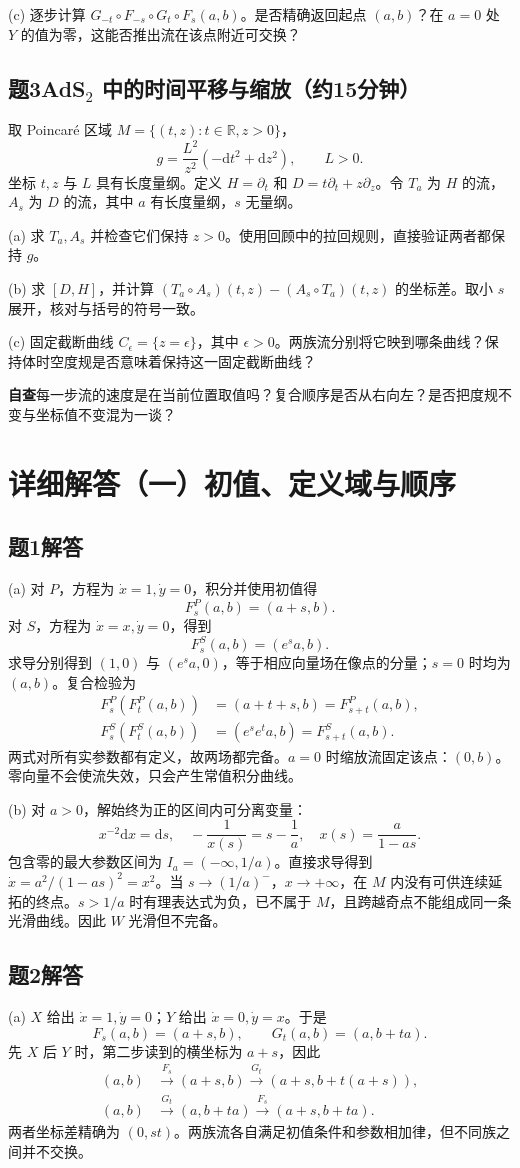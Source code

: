 \documentclass[11pt,a4paper]{article}
\newcommand{\D}{\mathrm d}
\newcommand{\head}[1]{\section*{\color{teal}#1}}
\begin{document}
(c) 逐步计算 $G_{-t}\circ F_{-s}\circ G_t\circ F_s(a,b)$。是否精确返回起点 $(a,b)$？在 $a=0$ 处 $Y$ 的值为零，这能否推出流在该点附近可交换？

\subsection*{题3\quad AdS$_2$ 中的时间平移与缩放（约15分钟）}
取 Poincar\'e 区域 $M=\{(t,z):t\in\mathbb R,z>0\}$，
\[
 g=\frac{L^2}{z^2}(-\D t^2+\D z^2),\qquad L>0.
\]
坐标 $t,z$ 与 $L$ 具有长度量纲。定义 $H=\partial_t$ 和 $D=t\partial_t+z\partial_z$。令 $T_a$ 为 $H$ 的流，$A_s$ 为 $D$ 的流，其中 $a$ 有长度量纲，$s$ 无量纲。

(a) 求 $T_a,A_s$ 并检查它们保持 $z>0$。使用回顾中的拉回规则，直接验证两者都保持 $g$。

(b) 求 $[D,H]$，并计算 $(T_a\circ A_s)(t,z)-(A_s\circ T_a)(t,z)$ 的坐标差。取小 $s$ 展开，核对与括号的符号一致。

(c) 固定截断曲线 $C_\epsilon=\{z=\epsilon\}$，其中 $\epsilon>0$。两族流分别将它映到哪条曲线？保持体时空度规是否意味着保持这一固定截断曲线？

\textbf{自查}\quad 每一步流的速度是在当前位置取值吗？复合顺序是否从右向左？是否把度规不变与坐标值不变混为一谈？
\newpage
\head{详细解答（一）\quad 初值、定义域与顺序}
\subsection*{题1解答}
(a) 对 $P$，方程为 $\dot x=1,\dot y=0$，积分并使用初值得
\[
 F_s^P(a,b)=(a+s,b).
\]
对 $S$，方程为 $\dot x=x,\dot y=0$，得到
\[
 F_s^S(a,b)=(e^sa,b).
\]
求导分别得到 $(1,0)$ 与 $(e^sa,0)$，等于相应向量场在像点的分量；$s=0$ 时均为 $(a,b)$。复合检验为
\begin{align*}
 F_s^P(F_t^P(a,b))&=(a+t+s,b)=F_{s+t}^P(a,b),\\
 F_s^S(F_t^S(a,b))&=(e^se^ta,b)=F_{s+t}^S(a,b).
\end{align*}
两式对所有实参数都有定义，故两场都完备。$a=0$ 时缩放流固定该点：$(0,b)$。零向量不会使流失效，只会产生常值积分曲线。

(b) 对 $a>0$，解始终为正的区间内可分离变量：
\[
 x^{-2}\D x=\D s,\quad -\frac1{x(s)}=s-\frac1a,
 \quad x(s)=\frac{a}{1-as}.
\]
包含零的最大参数区间为 $I_a=(-\infty,1/a)$。直接求导得到 $\dot x=a^2/(1-as)^2=x^2$。当 $s\to(1/a)^-$，$x\to+\infty$，在 $M$ 内没有可供连续延拓的终点。$s>1/a$ 时有理表达式为负，已不属于 $M$，且跨越奇点不能组成同一条光滑曲线。因此 $W$ 光滑但不完备。
\subsection*{题2解答}
(a) $X$ 给出 $\dot x=1,\dot y=0$；$Y$ 给出 $\dot x=0,\dot y=x$。于是
\[
 F_s(a,b)=(a+s,b),\qquad G_t(a,b)=(a,b+ta).
\]
先 $X$ 后 $Y$ 时，第二步读到的横坐标为 $a+s$，因此
\begin{align*}
 (a,b)&\xrightarrow{F_s}(a+s,b)\xrightarrow{G_t}(a+s,b+t(a+s)),\\
 (a,b)&\xrightarrow{G_t}(a,b+ta)\xrightarrow{F_s}(a+s,b+ta).
\end{align*}
两者坐标差精确为 $(0,st)$。两族流各自满足初值条件和参数相加律，但不同族之间并不交换。
\end{document}
